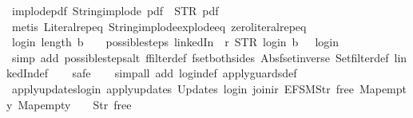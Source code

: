 \begin{isabellebody}
\endisatagproof
{\isafoldproof}%
%
\isadelimproof
\isanewline
%
\endisadelimproof
\isanewline
{}\isamarkupfalse%
\ implode{\isacharunderscore}pdf{\isacharcolon}\ {\isachardoublequoteopen}String{\isachardot}implode\ {\isacharprime}{\isacharprime}pdf{\isacharprime}{\isacharprime}\ {\isacharequal}\ STR\ {\isacharprime}{\isacharprime}pdf{\isacharprime}{\isacharprime}{\isachardoublequoteclose}\isanewline
%
\isadelimproof
\ \ %
\endisadelimproof
%
\isatagproof
{}\isamarkupfalse%
\ {\isacharparenleft}metis\ Literal{\isachardot}rep{\isacharunderscore}eq\ String{\isachardot}implode{\isacharunderscore}explode{\isacharunderscore}eq\ zero{\isacharunderscore}literal{\isachardot}rep{\isacharunderscore}eq{\isacharparenright}%
\endisatagproof
{\isafoldproof}%
%
\isadelimproof
\isanewline
%
\endisadelimproof
\isanewline
{}\isamarkupfalse%
\ log{\isacharunderscore}in{\isacharcolon}\ {\isachardoublequoteopen}length\ b\ {\isacharequal}\ {}\ {\isasymLongrightarrow}\ possible{\isacharunderscore}steps\ linkedIn\ {}\ r\ STR\ {\isacharprime}{\isacharprime}login{\isacharprime}{\isacharprime}\ b\ {\isacharequal}\ {\isacharbraceleft}{\isacharbar}{\isacharparenleft}{}{\isacharcomma}\ login{\isacharparenright}{\isacharbar}{\isacharbraceright}{\isachardoublequoteclose}\isanewline
%
\isadelimproof
\ \ %
\endisadelimproof
%
\isatagproof
{}\isamarkupfalse%
\ {\isacharparenleft}simp\ add{\isacharcolon}\ possible{\isacharunderscore}steps{\isacharunderscore}alt\ ffilter{\isacharunderscore}def\ fset{\isacharunderscore}both{\isacharunderscore}sides\ Abs{\isacharunderscore}fset{\isacharunderscore}inverse\ Set{\isachardot}filter{\isacharunderscore}def\ linkedIn{\isacharunderscore}def{\isacharparenright}\isanewline
\ \ \isamarkupfalse%
\ safe\isanewline
\ \ \isamarkupfalse%
\ {\isacharparenleft}simp{\isacharunderscore}all\ add{\isacharcolon}\ login{\isacharunderscore}def\ apply{\isacharunderscore}guards{\isacharunderscore}def{\isacharparenright}%
\endisatagproof
{\isafoldproof}%
%
\isadelimproof
\isanewline
%
\endisadelimproof
\isanewline
{}\isamarkupfalse%
\ apply{\isacharunderscore}updates{\isacharunderscore}login{\isacharcolon}\ {\isachardoublequoteopen}apply{\isacharunderscore}updates\ {\isacharparenleft}Updates\ login{\isacharparenright}\ {\isacharparenleft}join{\isacharunderscore}ir\ {\isacharbrackleft}EFSM{\isachardot}Str\ {\isacharprime}{\isacharprime}free{\isacharprime}{\isacharprime}{\isacharbrackright}\ Map{\isachardot}empty{\isacharparenright}\ Map{\isachardot}empty\ {\isacharequal}\ {\isacharless}{}\ {\isacharcolon}{\isacharequal}\ Str\ {\isacharprime}{\isacharprime}free{\isacharprime}{\isacharprime}{\isachargreater}{\isachardoublequoteclose}\isanewline

\end{isabellebody}
